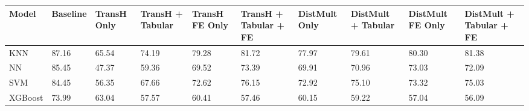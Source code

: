 \begin{tabular}{llllllllll}
\toprule
Model & Baseline & TransH Only & TransH + Tabular & TransH FE Only & TransH + Tabular + FE & DistMult Only & DistMult + Tabular & DistMult FE Only & DistMult + Tabular + FE \\
\midrule
KNN & 87.16 & 65.54 & 74.19 & 79.28 & 81.72 & 77.97 & 79.61 & 80.30 & 81.38 \\
NN & 85.45 & 47.37 & 59.36 & 69.52 & 73.39 & 69.91 & 70.96 & 73.03 & 72.09 \\
SVM & 84.45 & 56.35 & 67.66 & 72.62 & 76.15 & 72.92 & 75.10 & 73.32 & 75.03 \\
XGBoost & 73.99 & 63.04 & 57.57 & 60.41 & 57.46 & 60.15 & 59.22 & 57.04 & 56.09 \\
\bottomrule
\end{tabular}
